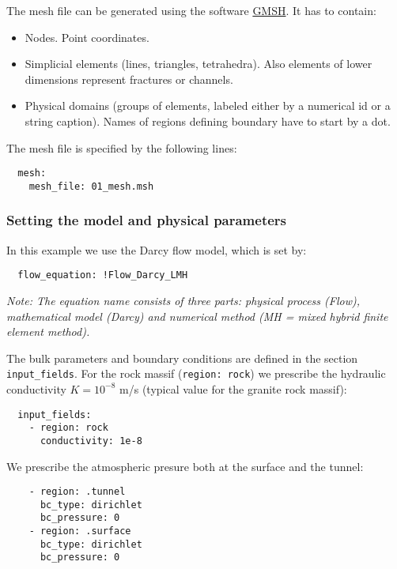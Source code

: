 The mesh file can be generated using the software
\href{http://www.gmsh.info}{GMSH}. It has to contain:

\begin{itemize}
\tightlist
\item
  Nodes. Point coordinates.
\item
  Simplicial elements (lines, triangles, tetrahedra). Also elements of
  lower dimensions represent fractures or channels.
\item
  Physical domains (groups of elements, labeled either by a numerical id
  or a string caption). Names of regions defining boundary have to start
  by a dot.
\end{itemize}

The mesh file is specified by the following lines:

\begin{verbatim}
  mesh:
    mesh_file: 01_mesh.msh
\end{verbatim}

\subsubsection{Setting the model and physical parameters}

In this example we use the Darcy flow model, which is set by:

\begin{verbatim}
  flow_equation: !Flow_Darcy_LMH
\end{verbatim}

\emph{Note: The equation name consists of three parts: physical process
(Flow), mathematical model (Darcy) and numerical method (MH = mixed
hybrid finite element method).}

The bulk parameters and boundary conditions are defined in the section
\texttt{input\_fields}. For the rock massif (\texttt{region:\ rock}) we
prescribe the hydraulic conductivity \(K = 10^{-8}\) m/s (typical value
for the granite rock massif):

\begin{verbatim}
  input_fields:
    - region: rock
      conductivity: 1e-8
\end{verbatim}

We prescribe the atmospheric presure both at the surface and the tunnel:

\begin{verbatim}
    - region: .tunnel
      bc_type: dirichlet
      bc_pressure: 0
    - region: .surface
      bc_type: dirichlet
      bc_pressure: 0
\end{verbatim}

